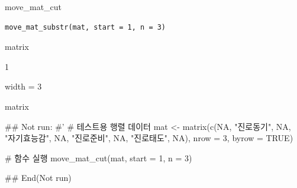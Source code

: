 \documentclass[a4paper]{book}
\begin{document}
%
\begin{Description}
move\_mat\_cut
\end{Description}
%
\begin{Usage}
\begin{verbatim}
move_mat_substr(mat, start = 1, n = 3)
\end{verbatim}
\end{Usage}
%
\begin{Arguments}
\begin{ldescription}
\item[\code{mat}] matrix

\item[\code{start}] 1

\item[\code{n}] width = 3
\end{ldescription}
\end{Arguments}
%
\begin{Value}
matrix
\end{Value}
%
\begin{Examples}
\begin{ExampleCode}

\#\# Not run: 
#'
# 테스트용 행렬 데이터
mat <- matrix(c(NA, "진로동기", NA, "자기효능감", NA,
    "진로준비", NA, "진로태도", NA), nrow = 3, byrow = TRUE)

# 함수 실행
move_mat_cut(mat, start = 1, n = 3)


## End(Not run)


\end{ExampleCode}
\end{Examples}
\end{document}
